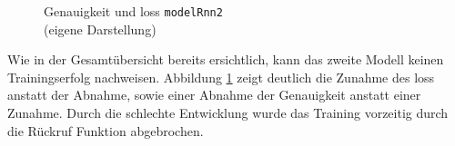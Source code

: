 \documentclass[
    12pt, %
    DIV10,
    ngerman, %
    a4paper, %
    oneside, %
    titlepage, %
    parskip=half, %
    headings=normal, %
    listof=totoc, %
    bibliography=totoc, %
    index=totoc, %
    captions=tableheading, %
    final %
]{scrreprt}
\begin{document}
\begin{figure}[H]
\caption{Genauigkeit und loss \texttt{modelRnn2}\\(eigene Darstellung)}\label{fig:rnn2}
\end{figure}
Wie in der Gesamtübersicht bereits ersichtlich, kann das zweite Modell keinen Trainingserfolg nachweisen. 
Abbildung \ref{fig:rnn2} zeigt deutlich die Zunahme des loss anstatt der Abnahme, sowie einer Abnahme der Genauigkeit anstatt einer Zunahme. Durch die schlechte Entwicklung wurde das Training vorzeitig durch die Rückruf Funktion abgebrochen.
\end{document}
